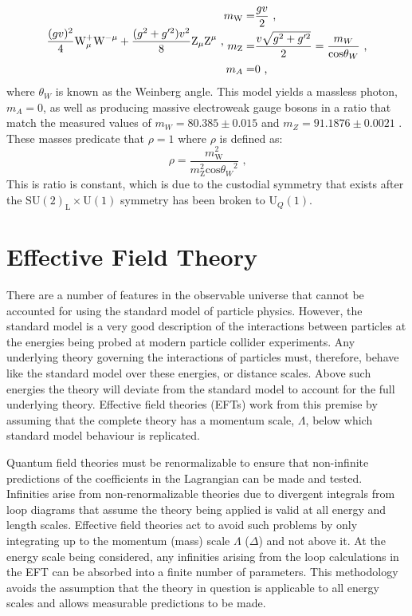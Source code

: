 %
\begin{equation}
\frac{(gv)^{2}}{4} \text{W}^{+}_{\mu} \text{W}^{-\mu} + \frac{(g^{2} + g'^{2})v^{2}}{8} \text{Z}_{\mu} \text{Z}^{\mu} \text{ ,}\\
\begin{aligned}
m_{\text{W}} = & \frac{gv}{2} \text{ ,} \\
m_{\text{Z}} = & \frac{v\sqrt{g^{2} + g'^{2}}}{2} = \frac{m_{W}}{\text{cos}{\theta_{W}}} \text{ ,} \\
m_{A} = & 0 \text{ ,}
\end{aligned}
\end{equation}
%
\noindent where $\theta_{W}$ is known as the Weinberg angle.  This model yields a massless photon, $m_{A} = 0$, as well as producing massive electroweak gauge bosons in a ratio that match the measured values of $m_{W} = 80.385 \pm 0.015$ and $m_{Z} = 91.1876 \pm 0.0021$ \cite{Beringer:1900zz}.  These masses predicate that $\rho = 1$ where $\rho$ is defined as:
%
\begin{equation}
\rho = \frac{m_{\text{W}}^{2}}{m_{\text{Z}}^{2}\text{cos}{\theta_{W}}^{2}} \text{ ,}
\label{equ:custodialsymmetry}
\end{equation}
%
\noindent This is ratio is constant, which is due to the custodial symmetry that exists after the $\text{SU}(2)_{\text{L}} \times \text{U}(1)$ symmetry has been broken to $\text{U}_{Q}(1)$.


\section{Effective Field Theory}
There are a number of features in the observable universe that cannot be accounted for using the standard model of particle physics.  However, the standard model is a very good description of the interactions between particles at the energies being probed at modern particle collider experiments.  Any underlying theory governing the interactions of particles must, therefore, behave like the standard model over these energies, or distance scales.  Above such energies the theory will deviate from the standard model to account for the full underlying theory.  Effective field theories (EFTs) work from this premise by assuming that the complete theory  has a momentum scale, $\Lambda$, below which standard model behaviour is replicated.  

Quantum field theories must be renormalizable to ensure that non-infinite predictions of the coefficients in the Lagrangian can be made and tested.  Infinities arise from non-renormalizable theories due to divergent integrals from loop diagrams that assume the theory being applied is valid at all energy and length scales.  Effective field theories act to avoid such problems by only integrating up to the momentum (mass) scale $\Lambda$ ($\Delta$) and not above it.  At the energy scale being considered, any infinities arising from the loop calculations in the EFT can be absorbed into a finite number of parameters.  This methodology avoids the assumption that the theory in question is applicable to all energy scales and allows measurable predictions to be made.  

